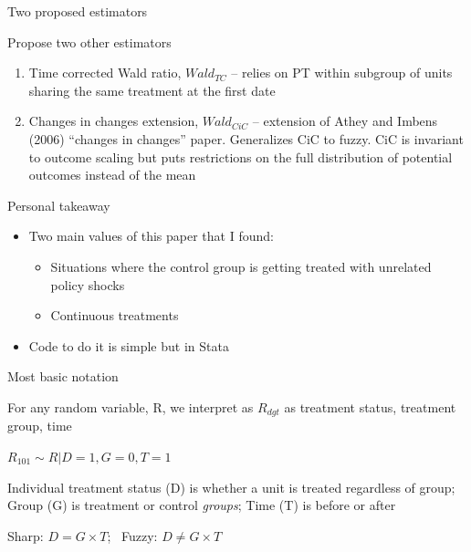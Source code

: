 \documentclass{beamer}
\begin{document}
\begin{frame}{Two proposed estimators}

 Propose two other estimators

	\begin{enumerate}
	\item Time corrected Wald ratio, $Wald_{TC}$ -- relies on PT within subgroup of units sharing the same treatment at the first date
	\item Changes in changes extension, $Wald_{CiC}$ -- extension of Athey and Imbens (2006) ``changes in changes'' paper. Generalizes CiC to fuzzy.  CiC is invariant to outcome scaling but puts restrictions on the full distribution of potential outcomes instead of the mean
	\end{enumerate}
	
\end{frame}

\begin{frame}{Personal takeaway}

\begin{itemize}
\item Two main values of this paper that I found:
	\begin{itemize}
	\item Situations where the control group is getting treated with unrelated policy shocks
	\item Continuous treatments
	\end{itemize}
\item Code to do it is simple but in Stata

\end{itemize}

\end{frame}


\begin{frame}{Most basic notation}

For any random variable, R, we interpret as $R_{dgt}$ as treatment status, treatment group, time \

\bigskip

$R_{101} \sim R | D=1, G=0, T=1$ \

\bigskip

Individual treatment status (D) is whether a unit is treated regardless of group; Group (G) is treatment or control \emph{groups}; Time (T) is before or after \

\bigskip

Sharp: $D = G \times T$; \
Fuzzy: $D\neq G \times T$

\end{frame}
\end{document}
